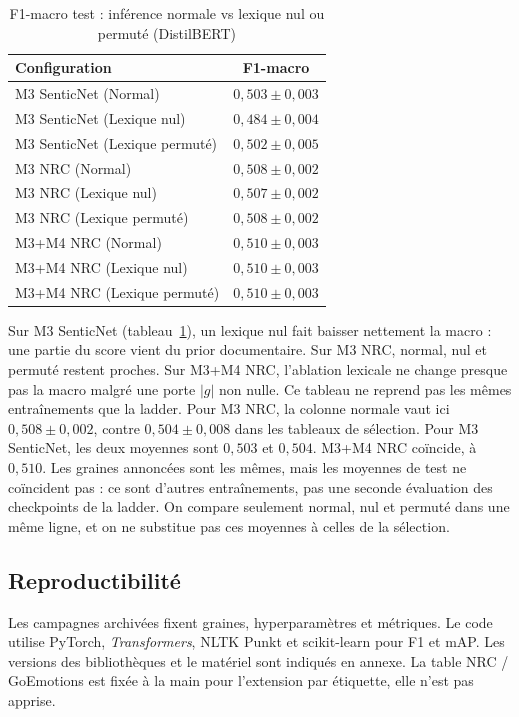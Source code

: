 \begin{table}[H]
\centering
\caption{F1-macro test : inférence normale vs lexique nul ou permuté (DistilBERT)}
\label{tab:expe-lexicon-ablation}
\renewcommand{\arraystretch}{1.2}
\setlength{\tabcolsep}{4pt}
\small
\begin{tabular}{|>{\raggedright\arraybackslash}p{6.2cm}|c|}
\hline
\textbf{Configuration} & \textbf{F1-macro} \\
\hline
M3 SenticNet (Normal) & $0{,}503 \pm 0{,}003$ \\
\hline
M3 SenticNet (Lexique nul) & $0{,}484 \pm 0{,}004$ \\
\hline
M3 SenticNet (Lexique permuté) & $0{,}502 \pm 0{,}005$ \\
\hline
M3 NRC (Normal) & $0{,}508 \pm 0{,}002$ \\
\hline
M3 NRC (Lexique nul) & $0{,}507 \pm 0{,}002$ \\
\hline
M3 NRC (Lexique permuté) & $0{,}508 \pm 0{,}002$ \\
\hline
M3+M4 NRC (Normal) & $0{,}510 \pm 0{,}003$ \\
\hline
M3+M4 NRC (Lexique nul) & $0{,}510 \pm 0{,}003$ \\
\hline
M3+M4 NRC (Lexique permuté) & $0{,}510 \pm 0{,}003$ \\
\hline
\end{tabular}
\end{table}

Sur M3 SenticNet (tableau~\ref{tab:expe-lexicon-ablation}), un lexique
nul fait baisser nettement la macro : une partie du score vient du prior
documentaire. Sur M3 NRC, normal, nul et permuté restent proches. Sur
M3+M4 NRC, l'ablation lexicale ne change presque pas la macro malgré une
porte $|g|$ non nulle. Ce tableau ne reprend pas les mêmes entraînements
que la ladder. Pour M3 NRC, la colonne normale vaut ici
$0{,}508 \pm 0{,}002$, contre $0{,}504 \pm 0{,}008$ dans les tableaux
de sélection. Pour M3 SenticNet, les deux moyennes sont $0{,}503$ et
$0{,}504$. M3+M4 NRC coïncide, à $0{,}510$. Les graines annoncées sont
les mêmes, mais les moyennes de test ne coïncident pas : ce sont
d'autres entraînements, pas une seconde évaluation des checkpoints de
la ladder. On compare seulement normal, nul et permuté dans une même
ligne, et on ne substitue pas ces moyennes à celles de la sélection.

\subsection{Reproductibilité}
Les campagnes archivées fixent graines, hyperparamètres et métriques.
Le code utilise PyTorch, \emph{Transformers}, NLTK Punkt et scikit-learn
pour F1 et mAP. Les versions des bibliothèques et le matériel sont
indiqués en annexe. La table NRC / GoEmotions est fixée à la main pour
l'extension par étiquette, elle n'est pas apprise.

